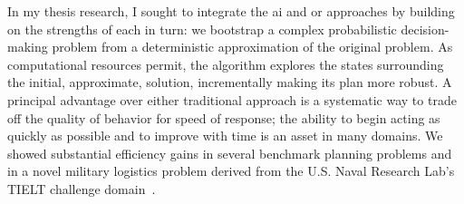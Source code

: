 \documentclass[12pt]{article}
\def\mdp{{\sc mdp}}
\begin{document}

In my thesis research, I sought to integrate the {\sc ai} and {\sc or} approaches by building on the strengths of each in turn: we bootstrap a complex probabilistic decision-making problem from  a deterministic approximation of the original problem. 
As computational resources permit, the algorithm explores the states surrounding the initial, approximate, solution, incrementally making its plan more robust.
A principal advantage over either traditional approach is 
a systematic way to trade off the quality of behavior for speed of response; the ability to begin acting as quickly as possible and to improve with time is an asset in many domains. 
We showed substantial efficiency gains in several benchmark planning problems and in a novel military logistics problem derived from the U.S. Naval Research Lab's TIELT challenge domain~\cite{molineaux}.





\end{document}
